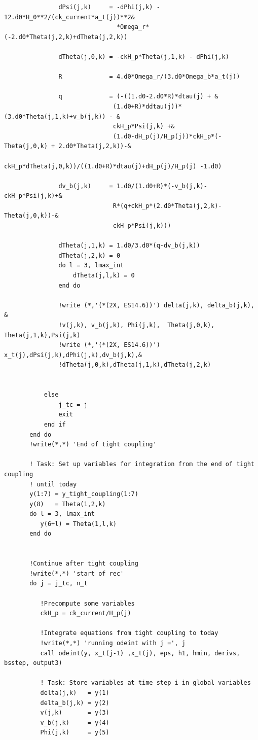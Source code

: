 \documentclass[a4paper]{report}
\begin{document}
\begin{verbatim}
               dPsi(j,k)     = -dPhi(j,k) - 12.d0*H_0**2/(ck_current*a_t(j))**2&
                               *Omega_r*(-2.d0*Theta(j,2,k)+dTheta(j,2,k))

               dTheta(j,0,k) = -ckH_p*Theta(j,1,k) - dPhi(j,k)

               R             = 4.d0*Omega_r/(3.d0*Omega_b*a_t(j))

               q             = (-((1.d0-2.d0*R)*dtau(j) + &
                              (1.d0+R)*ddtau(j))*(3.d0*Theta(j,1,k)+v_b(j,k)) - &
                              ckH_p*Psi(j,k) +&
                              (1.d0-dH_p(j)/H_p(j))*ckH_p*(-Theta(j,0,k) + 2.d0*Theta(j,2,k))-&
                              ckH_p*dTheta(j,0,k))/((1.d0+R)*dtau(j)+dH_p(j)/H_p(j) -1.d0)
 
               dv_b(j,k)     = 1.d0/(1.d0+R)*(-v_b(j,k)-ckH_p*Psi(j,k)+&
                              R*(q+ckH_p*(2.d0*Theta(j,2,k)-Theta(j,0,k))-&
                              ckH_p*Psi(j,k)))

               dTheta(j,1,k) = 1.d0/3.d0*(q-dv_b(j,k))
               dTheta(j,2,k) = 0
               do l = 3, lmax_int
                   dTheta(j,l,k) = 0 
               end do	

               !write (*,'(*(2X, ES14.6))') delta(j,k), delta_b(j,k), &
               !v(j,k), v_b(j,k), Phi(j,k),  Theta(j,0,k), Theta(j,1,k),Psi(j,k)
               !write (*,'(*(2X, ES14.6))') x_t(j),dPsi(j,k),dPhi(j,k),dv_b(j,k),&
               !dTheta(j,0,k),dTheta(j,1,k),dTheta(j,2,k)


           else
               j_tc = j
               exit
           end if
       end do
       !write(*,*) 'End of tight coupling'

       ! Task: Set up variables for integration from the end of tight coupling 
       ! until today
       y(1:7) = y_tight_coupling(1:7)
       y(8)   = Theta(1,2,k)
       do l = 3, lmax_int
          y(6+l) = Theta(1,l,k)
       end do


       !Continue after tight coupling
       !write(*,*) 'start of rec'       
       do j = j_tc, n_t

          !Precompute some variables
          ckH_p = ck_current/H_p(j)

          !Integrate equations from tight coupling to today
          !write(*,*) 'running odeint with j =', j
          call odeint(y, x_t(j-1) ,x_t(j), eps, h1, hmin, derivs, bsstep, output3)

          ! Task: Store variables at time step i in global variables
          delta(j,k)   = y(1)
          delta_b(j,k) = y(2)
          v(j,k)       = y(3)
          v_b(j,k)     = y(4)
          Phi(j,k)     = y(5)
          

\end{verbatim}
\end{document}
